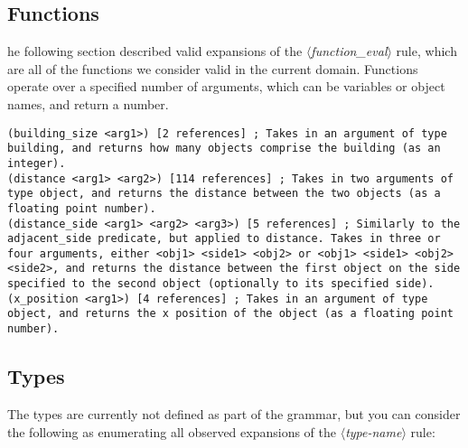 \documentclass{article}
\newcommand{\dsl}[1]{{\it $\langle$#1$\rangle$}}
\begin{document}
\subsection{Functions} \label{sec:functions}
he following section described valid expansions of the \dsl{function_eval} rule,
        which are all of the functions we consider valid in the current domain.
        Functions operate over a specified number of arguments, which can be variables or object names, and return a number.
\begin{lstlisting}
(building_size <arg1>) [2 references] ; Takes in an argument of type building, and returns how many objects comprise the building (as an integer).
(distance <arg1> <arg2>) [114 references] ; Takes in two arguments of type object, and returns the distance between the two objects (as a floating point number).
(distance_side <arg1> <arg2> <arg3>) [5 references] ; Similarly to the adjacent_side predicate, but applied to distance. Takes in three or four arguments, either <obj1> <side1> <obj2> or <obj1> <side1> <obj2> <side2>, and returns the distance between the first object on the side specified to the second object (optionally to its specified side).
(x_position <arg1>) [4 references] ; Takes in an argument of type object, and returns the x position of the object (as a floating point number).
\end{lstlisting}



\subsection{Types} \label{sec:types}
The types are currently not defined as part of the grammar, but you can consider the following as enumerating all observed expansions of the \dsl{type-name} rule:
\end{document}
